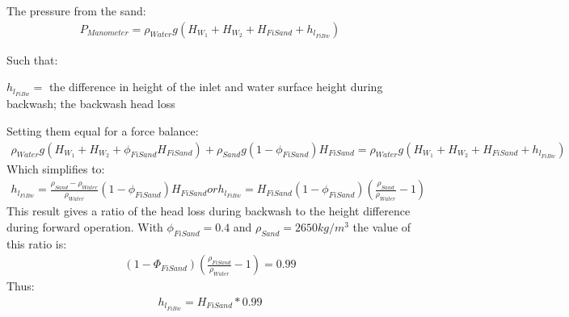 \documentclass[letterpaper,10pt,english]{sphinxmanual}
\begin{document}
The pressure from the sand:
\begin{equation}\label{equation:Filtration/Filtration_Derivations:Filtration/Filtration_Derivations:1}
\begin{split}P_{Manometer} = \rho_{Water} g \left( H_{W_1} + H_{W_2} + H_{FiSand} + h_{l_{FiBw}} \right)\end{split}
\end{equation}
\begin{DUlineblock}{0em}
\item[] Such that:
\item[] \(h_{l_{FiBw}} =\) the difference in height of the inlet and water surface height during backwash; the backwash head loss
\end{DUlineblock}

Setting them equal for a force balance:
\begin{equation}\label{equation:Filtration/Filtration_Derivations:Filtration/Filtration_Derivations:2}
\begin{split}\rho_{Water} g \left( H_{W_1} + H_{W_2} + \phi_{FiSand} H_{FiSand} \right) + \rho_{Sand} g \left( 1 - \phi_{FiSand} \right) H_{FiSand} = \rho_{Water} g \left( H_{W_1} + H_{W_2} + H_{FiSand} + h_{l_{FiBw}} \right)\end{split}
\end{equation}
Which simplifies to:
\begin{equation}\label{equation:Filtration/Filtration_Derivations:Filtration/Filtration_Derivations:3}
\begin{split}h_{l_{FiBw}} = \frac{\rho_{Sand} - \rho_{Water}}{\rho_{Water}} \left( 1 - \phi_{FiSand} \right) H_{FiSand}
or
h_{l_{FiBw}} = H_{FiSand} \left( 1 - \phi_{FiSand} \right)  \left( \frac{\rho_{Sand}}{\rho_{Water}} - 1 \right)\end{split}
\end{equation}
This result gives a ratio of the head loss during backwash to the height difference during forward operation. With \(\phi_{FiSand} = 0.4\) and \(\rho_{Sand} = 2650 kg/m^3\) the value of this ratio is:
\begin{equation}\label{equation:Filtration/Filtration_Derivations:Filtration/Filtration_Derivations:4}
\begin{split}\left( 1- \Phi_{FiSand} \right) \left( \frac{\rho_{FiSand}}{\rho_{Water}} - 1 \right) = 0.99\end{split}
\end{equation}
Thus:
\begin{equation}\label{equation:Filtration/Filtration_Derivations:Filtration/Filtration_Derivations:5}
\begin{split}h_{l_{FiBw}} = H_{FiSand} * 0.99\end{split}
\end{equation}
\end{document}
